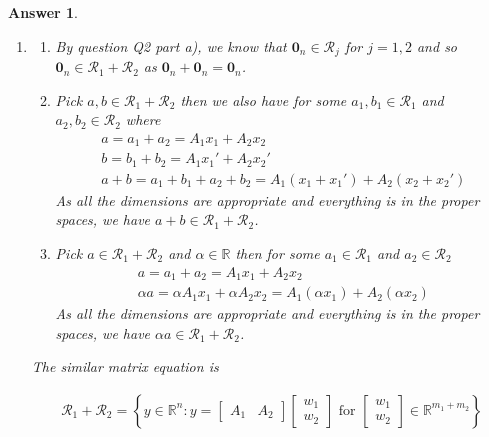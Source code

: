 \documentclass[12pt]{article}
\theoremstyle{colon}
\newtheorem*{answer}{Answer}
\begin{document}
\begin{answer}
\begin{enumerate}[label=\alph*)]
    \item 
      \begin{enumerate}[label=\roman*)]

        \item By question Q2  part a), we know that $\bm{0}_n \in \mathcal{R}_j$ for $j = 1, 2$ and so $\bm{0}_n \in \mathcal{R}_1 + \mathcal{R}_2$ as $\bm{0}_n + \bm{0}_n = \bm{0}_n$.

        \item Pick $a, b \in \mathcal{R}_1 + \mathcal{R}_2$ then we also have for some $a_1, b_1 \in \mathcal{R}_1$ and $a_2, b_2 \in \mathcal{R}_2$ where
          \begin{gather*}
            a = a_1 + a_2 = A_1 x_1 + A_2 x_2 \\
            b = b_1 + b_2 = A_1 x_1' + A_2 x_2' \\
            a + b = a_1 + b_1 + a_2 + b_2 = A_1 (x_1 + x_1') + A_2 (x_2 + x_2')
          \end{gather*}
          As all the dimensions are appropriate and everything is in the proper spaces, we have $a + b \in \mathcal{R}_1 + \mathcal{R}_2$.

        \item Pick $a \in \mathcal{R}_1 + \mathcal{R}_2$ and $\alpha \in \mathbb{R}$ then for some $a_1 \in \mathcal{R}_1$ and $a_2 \in \mathcal{R}_2$
          \begin{gather*}
            a = a_1 + a_2 = A_1 x_1 + A_2 x_2 \\
            \alpha a = \alpha A_1 x_1 + \alpha A_2 x_2 = A_1 (\alpha x_1) + A_2 (\alpha x_2)
          \end{gather*}
          As all the dimensions are appropriate and everything is in the proper spaces, we have $\alpha a \in \mathcal{R}_1 + \mathcal{R}_2$.
      \end{enumerate}

      The similar matrix equation is 
      
      \begin{gather*}
        \mathcal{R}_1 + \mathcal{R}_2 = \left\{ y \in \mathbb{R}^n: y = \begin{bmatrix} A_1 & A_2 \end{bmatrix} \begin{bmatrix} w_1 \\ w_2 \end{bmatrix} \text{ for } \begin{bmatrix} w_1 \\ w_2 \end{bmatrix} \in \mathbb{R}^{m_1 + m_2} \right\}
      \end{gather*}
  \end{enumerate}
\end{answer}
\end{document}
